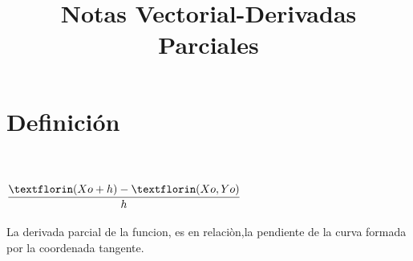 \documentclass[12pt]{article}
\title{ Notas Vectorial-Derivadas Parciales}
\begin{document}
\maketitle


\section{Definición}\\ \\

\varinjlim $\dfrac{\textflorin(Xo + h)-\textflorin(Xo,Yo)}{h}$ \\ \\

La derivada parcial de la funcion, es en relaciòn,la pendiente de la curva formada por la coordenada tangente.\\ \\
\end{document}
